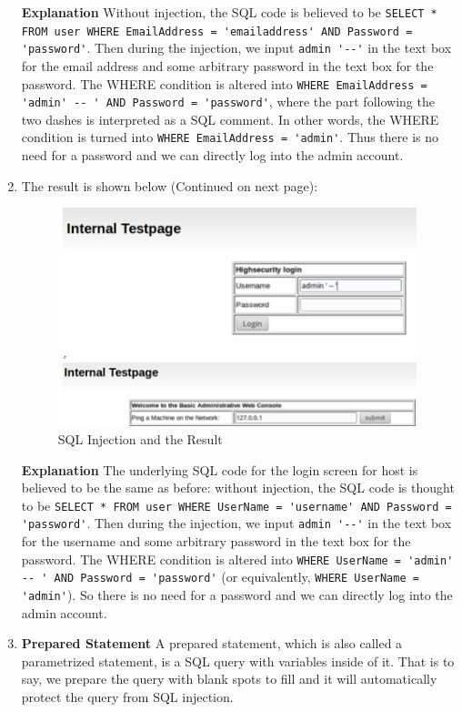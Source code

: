\begin{enumerate}
  \textbf{Explanation} Without injection, the SQL code is believed to be \lstinline{SELECT * FROM user WHERE EmailAddress = 'emailaddress' AND Password = 'password'}. Then during the injection, we input \lstinline{admin '--'} in the text box for the email address and some arbitrary password in the text box for the password. The WHERE condition is altered into \lstinline{WHERE EmailAddress = 'admin' -- ' AND Password = 'password'}, where the part following the two dashes is interpreted as a SQL comment. In other words, the WHERE condition is turned into \lstinline{WHERE EmailAddress = 'admin'}. Thus there is no need for a password and we can directly log into the admin account.
\item The result is shown below (Continued on next page):
\begin{figure}[h!]
	\caption{SQL Injection and the Result}
	\centering \includegraphics[height=2.5in]{sqli2}
\end{figure}
  \textbf{Explanation} The underlying SQL code for the login screen for host  is believed to be the same as before: without injection, the SQL code is thought to be \lstinline{SELECT * FROM user WHERE UserName = 'username' AND Password = 'password'}. Then during the injection, we input \lstinline{admin '--'} in the text box for the username and some arbitrary password in the text box for the password. The WHERE condition is altered into \lstinline{WHERE UserName = 'admin' -- ' AND Password = 'password'} (or equivalently, \lstinline{WHERE UserName = 'admin'}). So there is no need for a password and we can directly log into the admin account.
\item \textbf{Prepared Statement} 
  A prepared statement, which is also called a parametrized statement, is a SQL query with variables inside of it. That is to say, we prepare the query with blank spots to fill and it will automatically protect the query from SQL injection.


\end{enumerate}
